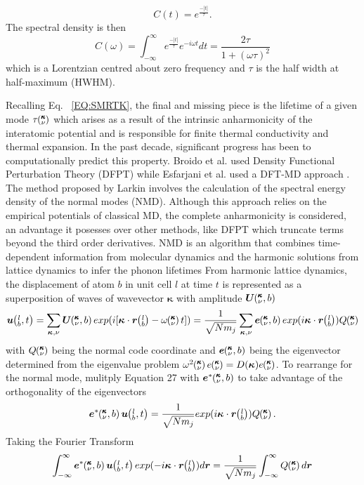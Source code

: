 %
\begin{equation}
C(t)=e^{\frac{-|t|}{\tau}}.
\end{equation}
%
The spectral density is then
\begin{equation}
C(\omega)=\int_{-\infty}^{\infty}e^{\frac{-|t|}{\tau}}e^{-i\omega t}dt=\frac{2\tau}{1+(\omega \tau )^2}
\end{equation}
which is a Lorentzian centred about zero frequency and $\tau$ is the half width at half-maximum (HWHM).

Recalling Eq. ~\ref{EQ:SMRTK}, the final and missing piece is the lifetime of a given mode $\tau\mspace{-4.0mu}\left(\mspace{-8.0mu} \begin{smallmatrix}&\pmb{\kappa} \\&\nu\end{smallmatrix} \mspace{-3.0mu}\right)$ which arises as a result of the intrinsic anharmonicity of the interatomic potential and is responsible for finite thermal conductivity and thermal expansion. In the past decade, significant progress has been to computationally predict this property. Broido et al. used Density Functional Perturbation Theory (DFPT) \cite{Broido1} while Esfarjani et al. used a DFT-MD approach \cite{PhysRevB.84.085204}. The method proposed by Larkin \cite{jason_inpress} involves the calculation of the spectral energy density of the normal modes (NMD). Although this approach relies on the empirical potentials of classical MD, the complete anharmonicity is considered, an advantage it posesses over other methods, like DFPT which truncate terms beyond the third order derivatives. NMD is an algorithm that combines time-dependent information from molecular dynamics and the harmonic solutions from lattice dynamics to infer the phonon lifetimes From harmonic lattice dynamics, the displacement of atom $b$ in unit cell $l$ at time $t$ is represented as a superposition of waves of wavevector $\bm{\kappa}$ with amplitude $\bm{U}\mspace{-4.0mu}\left(\mspace{-8.0mu} \begin{smallmatrix} &\pmb{\kappa} \\ &\nu \end{smallmatrix} \mspace{-2.0mu},b\right)$
%
\begin{equation}
\bm{u}\lbt=\sum_{\bm{\kappa},\nu}\bm{U}\kvb exp(i[\bm{\kappa}\cdot\bm{r}\lb-\omega\kv t])=\frac{1}{\sqrt{Nm_j}}\sum_{\bm{\kappa},\nu}\bm{e}\kvb exp(i\bm{\kappa}\cdot\bm{r}\lb)Q\kv
\end{equation}
%
with $Q\mspace{-4.0mu}\left(\mspace{-8.0mu} \begin{smallmatrix}&\pmb{\kappa} \\&\nu\end{smallmatrix} \mspace{-3.0mu}\right)$ being the normal code coordinate and $\bm{e}\mspace{-4.0mu}\left(\mspace{-8.0mu} \begin{smallmatrix} &\pmb{\kappa} \\ &\nu \end{smallmatrix} \mspace{-2.0mu},b\right)$ being the eigenvector determined from the eigenvalue problem $\omega^2\kv e\kv=D(\bm{\kappa})e\kv$. To rearrange for the normal mode, mulitply Equation 27 with $\bm{e}^*\mspace{-4.0mu}\left(\mspace{-8.0mu} \begin{smallmatrix} &\pmb{\kappa} \\ &\nu \end{smallmatrix} \mspace{-2.0mu},b\right)$ to take advantage of the orthogonality of the eigenvectors
%
\begin{equation}
\bm{e}^*\kvb\bm{u}\lbt=\frac{1}{\sqrt{Nm_j}}exp(i\bm{\kappa}\cdot\bm{r}\lb)Q\kv.
\end{equation}
%
Taking the Fourier Transform
%
\begin{equation}
\int_{-\infty}^{\infty}\bm{e}^*\kvb\bm{u}\lbt exp(-i\bm{\kappa}\cdot\bm{r}\lb)d\bm{r}=\frac{1}{\sqrt{Nm_j}}\int_{-\infty}^{\infty}Q\kv d\bm{r}
\end{equation}
